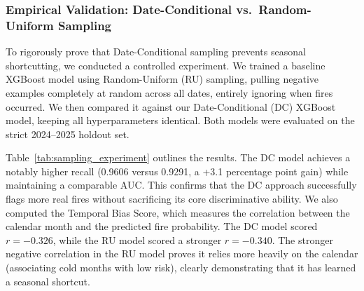 \subsubsection{Empirical Validation: Date-Conditional vs.\ Random-Uniform Sampling}
\label{sec:sampling_experiment}

To rigorously prove that Date-Conditional sampling prevents seasonal shortcutting, we conducted a controlled experiment. We trained a baseline XGBoost model using Random-Uniform (RU) sampling, pulling negative examples completely at random across all dates, entirely ignoring when fires occurred. We then compared it against our Date-Conditional (DC) XGBoost model, keeping all hyperparameters identical. Both models were evaluated on the strict 2024--2025 holdout set.

Table~\ref{tab:sampling_experiment} outlines the results. The DC model achieves a notably higher recall (0.9606 versus 0.9291, a +3.1 percentage point gain) while maintaining a comparable AUC. This confirms that the DC approach successfully flags more real fires without sacrificing its core discriminative ability. We also computed the Temporal Bias Score, which measures the correlation between the calendar month and the predicted fire probability. The DC model scored $r = -0.326$, while the RU model scored a stronger $r = -0.340$. The stronger negative correlation in the RU model proves it relies more heavily on the calendar (associating cold months with low risk), clearly demonstrating that it has learned a seasonal shortcut.

\begin{table}[H]
\centering
\renewcommand{\arraystretch}{1.25}
\caption{Controlled comparison of Date-Conditional (DC) vs.\ Random-Uniform (RU) negative sampling strategies on the held-out 2024--2025 test set. Both models use XGBoost with identical hyperparameters; only the negative sampling strategy differs. DC achieves significantly higher recall (+3.1 pp), confirming it recovers more true fire events. The smaller absolute value of the month--probability correlation for DC ($|r|=0.326$ vs.\ $0.340$) confirms that the DC model is less dependent on the seasonal prior, i.e.\ it exploits the fire-season calendar shortcut less.}
\label{tab:sampling_experiment}
\end{table}

